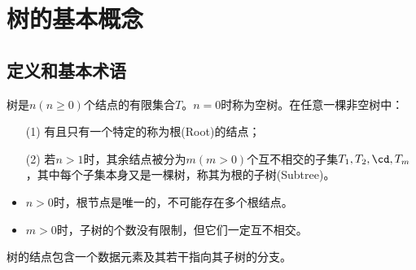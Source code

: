 
\section{树的基本概念}

\subsection{定义和基本术语}

\begin{frame}\ft{\subsecname}
\begin{dingyi}[树-Tree]
树是$n(n\ge0)$个结点的有限集合$T$。$n=0$时称为空树。在任意一棵非空树中：
\begin{itemize}
\item[(1)]
有且只有一个特定的称为根(Root)的结点；
\item[(2)]
若$n>1$时，其余结点被分为$m(m>0)$个互不相交的子集$T_1,T_2,\cd,T_m$，其中每个子集本身又是一棵树，称其为根的子树(Subtree)。
\end{itemize}
\end{dingyi}

\end{frame}
%
\begin{frame}\ft{\subsecname}
\begin{figure}[ht!]
\centering
\begin{minipage}[t]{0.8\textwidth}
\centering
        
\end{minipage}
 
\begin{minipage}[t]{0.33\textwidth}
\centering
        
\end{minipage}\hfill
\begin{minipage}[t]{0.33\textwidth}
\centering
        
\end{minipage}\hfill
\begin{minipage}[t]{0.33\textwidth}
\centering
        
\end{minipage}
\end{figure}
\end{frame}
%
\begin{frame}\ft{\subsecname}
\begin{itemize}
\item $n>0$时，根节点是唯一的，不可能存在多个根结点。\\[0.1in]
\item $m>0$时，子树的个数没有限制，但它们一定互不相交。
\end{itemize}
\end{frame}
%
\begin{frame}\ft{\subsecname}
\begin{dingyi}[结点-node]
树的结点包含一个数据元素及其若干指向其子树的分支。
\end{dingyi}
\pause 

\begin{figure}
\centering

\end{figure}

\end{frame}
%

